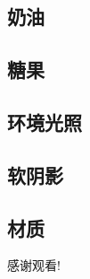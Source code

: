 \documentclass[aspectratio=169]{ctexbeamer} %
\begin{document}
\subsection{奶油}
\subsection{糖果}
\subsection{环境光照}
\subsection{软阴影}
\subsection{材质}

\begin{frame}
    \begin{center}
        \Huge{感谢观看!}
    \end{center}
\end{frame}
\end{document}

